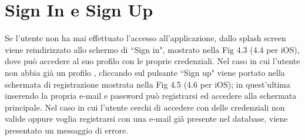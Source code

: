 \section{Sign In e Sign Up}
Se l'utente non ha mai effettuato l'accesso all'applicazione, dallo splash screen viene reindirizzato allo schermo di ``Sign in", mostrato nella Fig 4.3 (4.4 per iOS), dove pu\`o accedere al suo profilo con le proprie credenziali.
Nel caso in cui l'utente non abbia gi\`a un profilo , cliccando sul pulsante ``Sign up" viene portato nella schermata di registrazione mostrata nella Fig
4.5 (4.6 per iOS); in quest'ultima inserendo la propria e-mail e password pu\`o registrarsi ed accedere alla schermata principale.
Nel caso in cui l'utente cerchi di accedere con delle credenziali non valide oppure voglia registrarsi con una e-mail gi\`a
presente nel database, viene presentato un messaggio di errore.
